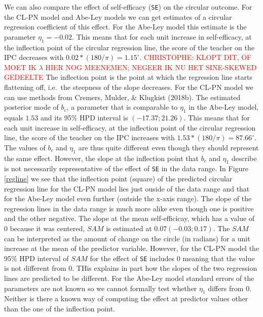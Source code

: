\documentclass[11pt,]{article}
\begin{document}
We can also compare the effect of self-efficacy (\verb|SE|) on the
circular outcome. For the CL-PN model and Abe-Ley models we can get
estimates of a circular regression coefficient of this effect. For the
Abe-Ley model this estimate is the parameter \(\eta_1 = -0.02\). This
means that for each unit increase in self-efficacy, at the inflection
point of the circular regression line, the score of the teacher on the
IPC decreases with \(0.02*(180/\pi) = 1.15^\circ\).
\textcolor{red}{CHRISTOPHE: KLOPT DIT, OF MOET IK $\lambda$ HIER NOG MEENEMEN; NEGEER IK NU HET SINE-SKEWED GEDEELTE}
The inflection point is the point at which the regression line starts
flattening off, i.e.~the steepness of the slope decreases. For the CL-PN
model we can use methods from Cremers, Mulder, \& Klugkist (2018b). The
estimated posterior mode of \(b_c\), a parameter that is comparable to
\(\eta_1\) in the Abe-Ley model, equals \(1.53\) and its 95\% HPD
interval is \((-17.37; 21.26)\). This means that for each unit increase
in self-efficacy, at the inflection point of the circular regression
line, the score of the teacher on the IPC increases with
\(1.53*(180/\pi) = 87.66^\circ\). The values of \(b_c\) and \(\eta_1\)
are thus quite different even though they should represent the same
effect. However, the slope at the inflection point that \(b_c\) and
\(\eta_1\) describe is not necessarily representative of the effect of
\verb|SE| in the data range. In Figure \ref{regline} we see that the
inflection point (square) of the predicted circular regression line for
the CL-PN model lies just ouside of the data range and that for the
Abe-Ley model even further (outside the x-axis range). The slope of the
regression lines in the data range is much more alike even though one is
positive and the other negative. The slope at the mean self-efficicay,
which has a value of 0 because it was centered, \(SAM\) is estimated at
\(0.07 (-0.03; 0.17)\). The \(SAM\) can be interpreted as the amount of
change on the circle (in radians) for a unit increase at the mean of the
predictor variable. However, for the CL-PN model the 95\% HPD interval
of \(SAM\) for the effect of \verb|SE| includes 0 meaning that the value
is not different from 0. THis explains in part how the slopes of the two
regression lines are predicted to be different. For the Abe-Ley model
standard errors of the parameters are not known so we cannot formally
test whether \(\eta_1\) differs from 0. Neither is there a known way of
computing the effect at predictor values other than the one of the
inflection point.
\end{document}
